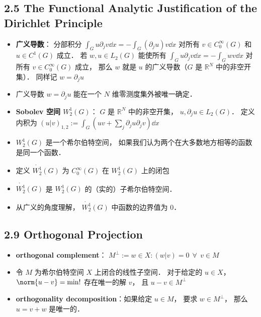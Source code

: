 \subsection{2.5 The Functional Analytic Justification of the Dirichlet Principle}
\begin{itemize}
\item \textbf{广义导数}： 分部积分 $\int_G u\partial_j v\dd{x} = -\int_G (\partial_j u)v\dd{x}$ 对所有 $v \in C_0^\infty(G)$ 和 $u \in C^1(G)$ 成立． 若 $w, u\in L_2(G)$ 能使所有 $\int_G u\partial_j v\dd{x} = -\int_G wv\dd{x}$ 对所有 $v \in C_0^\infty(G)$ 成立， 那么 $w$ 就是 $u$ 的广义导数（$G$ 是 $\mathbb R^N$ 中的非空开集）． 同样记 $w = \partial_j u$

\item 广义导数 $w = \partial_j u$ 能在一个 $N$ 维零测度集外被唯一确定．

\item \textbf{Sobolev 空间 $W_2^1(G)$}： $G$ 是 $\mathbb R^N$ 中的非空开集， $u, \partial_ju \in L_2(G)$． 定义内积为 $(u|v)_{1,2} := \int_G(uv + \sum_j \partial_j u\partial_j v) \dd{x}$

\item $W_2^1(G)$ 是一个希尔伯特空间， 如果我们认为两个在大多数地方相等的函数是同一个函数．

\item 定义 $\mathring {W_2^1}(G)$ 为 $C_0^\infty(G)$ 在 $W_2^1(G)$ 上的闭包

\item $\mathring {W_2^1}(G)$ 是 $W_2^1(G)$ 的（实的）子希尔伯特空间．

\item 从广义的角度理解， $\mathring {W_2^1}(G)$ 中函数的边界值为 0．
\end{itemize}

\subsection{2.9 Orthogonal Projection}
\begin{itemize}
\item \textbf{orthogonal complement}： $M^\bot := {w \in X: (w|v) = 0\ \ \forall\ \ v\in M}$

\item 令 $M$ 为希尔伯特空间 $X$ 上闭合的线性子空间． 对于给定的 $u\in X$， $\norm{u - v} = \min!$ 存在唯一的解 $v$， 且 $u - v\in M^\bot$

\item \textbf{orthogonality decomposition}：如果给定 $u \in M$， 要求 $w \in M^\bot$， 那么 $u = v + w$ 是唯一的．
\end{itemize}

